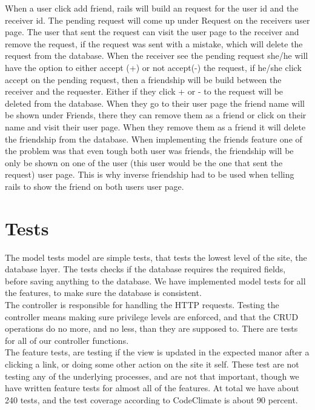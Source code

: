 \documentclass[a4paper]{article}
\begin{document}
\noindent
When a user click add friend, rails will build an request for the user id and the receiver id. The pending request will come up under Request on the receivers user page. The user that sent the request can visit the user page to the receiver and remove the request, if the request was sent with a mistake, which will delete the request from the database. When the receiver see the pending request she/he will have the option to either accept (+) or not accept(-) the request, if he/she click accept on the pending request, then a friendship will be build between the receiver and the requester. Either if they click + or - to the request will be deleted from the database. When they go to their user page the friend name will be shown under Friends, there they can remove them as a friend or click on their name and visit their user page. When they remove them as a friend it will delete the friendship from the database. When implementing the friends feature one of the problem was that even tough both user was friends, the friendship will be only be shown on one of the user (this user would be the one that sent the request) user page. This is why inverse friendship had to be used when telling rails to show the friend on both users user page. \\

\section{Tests}
\noindent
The model tests model are simple tests, that tests the lowest level of the site, the database layer. The tests checks if the database requires the required fields, before saving anything to the database. We have implemented model tests for all the features, to make sure the database is consistent.
\\

\noindent
The controller is responsible for handling the HTTP requests. Testing the controller means making sure privilege levels are enforced, and that the CRUD operations do no more, and no less, than they are supposed to. There are tests for all of our controller functions.
\\

\noindent
The feature tests, are testing if the view is updated in the expected manor after a clicking a link, or doing some other action on the site it self. These test are not testing any of the underlying processes, and are not that important, though we have written feature tests for almost all of the features. 
At total we have about 240 tests, and the test coverage according to CodeClimate is about 90 percent.
\\
\end{document}
